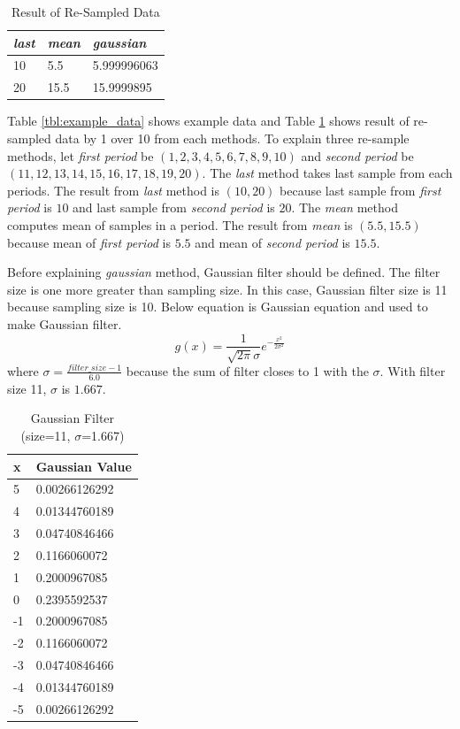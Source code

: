 \documentclass[draft,dvipsnames]{drexel-thesis}
\begin{document}
\begin{thesis}
\begin{table}[!t]
\centering
\caption{Result of Re-Sampled Data}
\label{tbl:result_resample}
\begin{tabular}{|l|l|l|}
\hline
{\em last} & {\em mean} & {\em gaussian}    \\ \hline
10   & 5.5  & 5.999996063 \\
20   & 15.5 & 15.9999895  \\ \hline
\end{tabular}
\end{table}

Table \ref{tbl:example_data} shows example data and Table \ref{tbl:result_resample} shows result of re-sampled data by 1 over 10 from each methods. To explain three re-sample methods, let {\em first period} be $(1, 2, 3, 4, 5, 6, 7, 8, 9, 10)$ and {\em second period} be $(11, 12, 13, 14, 15, 16, 17, 18, 19, 20)$. The {\em last} method takes last sample from each periods. The result from {\em last} method is $(10, 20)$ because last sample from {\em first period} is $10$ and last sample from {\em second period} is $20$. The {\em mean} method computes mean of samples in a period. The result from {\em mean} is $(5.5, 15.5)$ because mean of {\em first period} is $5.5$ and mean of {\em second period} is $15.5$.

Before explaining {\em gaussian} method, Gaussian filter should be defined. The filter size is one more greater than sampling size. In this case, Gaussian filter size is 11 because sampling size is 10. Below equation is Gaussian equation and used to make Gaussian filter.
$$g(x) = \frac{1}{\sqrt{2\pi}\sigma}e^{-\frac{x^2}{2\sigma^2}}$$
where $\sigma = \frac{filter\_size-1}{6.0}$ because the sum of filter closes to 1 with the $\sigma$. With filter size 11, $\sigma$ is $1.667$.

\begin{table}[!t]
\centering
\caption{Gaussian Filter (size=11, $\sigma$=1.667)}
\label{tbl:gaussian_filter}
\begin{tabular}{|l|l|}
\hline
x  & Gaussian Value \\ \hline
5  & 0.00266126292  \\
4  & 0.01344760189  \\
3  & 0.04740846466  \\
2  & 0.1166060072   \\
1  & 0.2000967085   \\
0  & 0.2395592537   \\
-1 & 0.2000967085   \\
-2 & 0.1166060072   \\
-3 & 0.04740846466  \\
-4 & 0.01344760189  \\
-5 & 0.00266126292  \\ \hline
\end{tabular}
\end{table}


\end{thesis}
\end{document}
